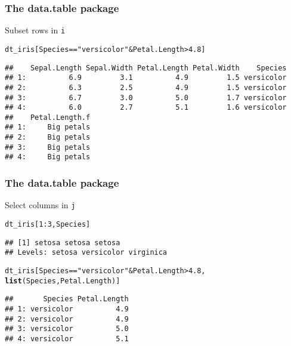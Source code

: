 \documentclass[paper=screen,mathserif]{beamer}\usepackage[]{graphicx}\usepackage[]{color}
\makeatletter
\newcommand{\hlnum}[1]{\textcolor[rgb]{0.686,0.059,0.569}{#1}}%
\newcommand{\hlstr}[1]{\textcolor[rgb]{0.192,0.494,0.8}{#1}}%
\newcommand{\hlopt}[1]{\textcolor[rgb]{0,0,0}{#1}}%
\newcommand{\hlstd}[1]{\textcolor[rgb]{0.345,0.345,0.345}{#1}}%
\newcommand{\hlkwd}[1]{\textcolor[rgb]{0.737,0.353,0.396}{\textbf{#1}}}%
\newenvironment{kframe}{%
 \def\at@end@of@kframe{}%
 \ifinner\ifhmode%
  \def\at@end@of@kframe{\end{minipage}}%
  \begin{minipage}{\columnwidth}%
 \fi\fi%
 \def\FrameCommand##1{\hskip\@totalleftmargin \hskip-\fboxsep
 \colorbox{shadecolor}{##1}\hskip-\fboxsep
     \hskip-\linewidth \hskip-\@totalleftmargin \hskip\columnwidth}%
 \MakeFramed {\advance\hsize-\width
   \@totalleftmargin\z@ \linewidth\hsize
   \@setminipage}}%
 {\par\unskip\endMakeFramed%
 \at@end@of@kframe}
\newenvironment{knitrout}{}{} %
\newcommand{\ft}[1]{\frametitle{#1}}
\makeatother
\begin{document}
\begin{frame}[fragile]
  \ft{The {\bf data.table} package}
  
  Subset rows in {\tt i}

\begin{knitrout}\scriptsize
{}\color{fgcolor}\begin{kframe}
\begin{alltt}
\hlstd{dt_iris[Species} \hlopt{==} \hlstr{"versicolor"} \hlopt{&} \hlstd{Petal.Length} \hlopt{>} \hlnum{4.8}\hlstd{]}
\end{alltt}
\begin{verbatim}
##    Sepal.Length Sepal.Width Petal.Length Petal.Width    Species
## 1:          6.9         3.1          4.9         1.5 versicolor
## 2:          6.3         2.5          4.9         1.5 versicolor
## 3:          6.7         3.0          5.0         1.7 versicolor
## 4:          6.0         2.7          5.1         1.6 versicolor
##    Petal.Length.f
## 1:     Big petals
## 2:     Big petals
## 3:     Big petals
## 4:     Big petals
\end{verbatim}
\end{kframe}
\end{knitrout}

\end{frame}

\begin{frame}[fragile]
  \ft{The {\bf data.table} package}
  
  Select columns in {\tt j}
\begin{knitrout}\scriptsize
{}\color{fgcolor}\begin{kframe}
\begin{alltt}
\hlstd{dt_iris[}\hlnum{1}\hlopt{:}\hlnum{3}\hlstd{, Species]}
\end{alltt}
\begin{verbatim}
## [1] setosa setosa setosa
## Levels: setosa versicolor virginica
\end{verbatim}
\begin{alltt}
\hlstd{dt_iris[Species} \hlopt{==} \hlstr{"versicolor"} \hlopt{&} \hlstd{Petal.Length} \hlopt{>} \hlnum{4.8}\hlstd{,}
        \hlkwd{list}\hlstd{(Species, Petal.Length)]}
\end{alltt}
\begin{verbatim}
##       Species Petal.Length
## 1: versicolor          4.9
## 2: versicolor          4.9
## 3: versicolor          5.0
## 4: versicolor          5.1
\end{verbatim}
\end{kframe}
\end{knitrout}
\end{frame}
\end{document}
